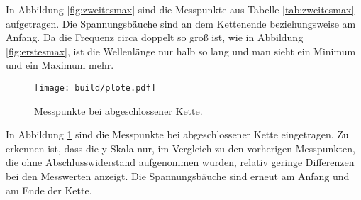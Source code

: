  In Abbildung \ref{fig:zweitesmax} sind die Messpunkte
aus Tabelle \ref{tab:zweitesmax} aufgetragen. Die Spannungsbäuche sind an dem
Kettenende beziehungsweise am Anfang. Da die Frequenz circa doppelt so groß ist,
wie in Abbildung \ref{fig:erstesmax}, ist die Wellenlänge nur halb so lang und
man sieht ein Minimum und ein Maximum mehr.

\begin{figure}[h]
  \centering
  \texttt{[image: build/plote.pdf]}
  \caption{Messpunkte bei abgeschlossener Kette.}
  \label{fig:absw=wellw}
\end{figure}

In Abbildung \ref{fig:absw=wellw} sind die Messpunkte bei abgeschlossener Kette
eingetragen. Zu erkennen ist, dass die y-Skala nur, im Vergleich zu den vorherigen
Messpunkten, die ohne Abschlusswiderstand aufgenommen wurden, relativ geringe Differenzen bei
den Messwerten anzeigt. Die Spannungsbäuche sind erneut am Anfang und am Ende der Kette.
